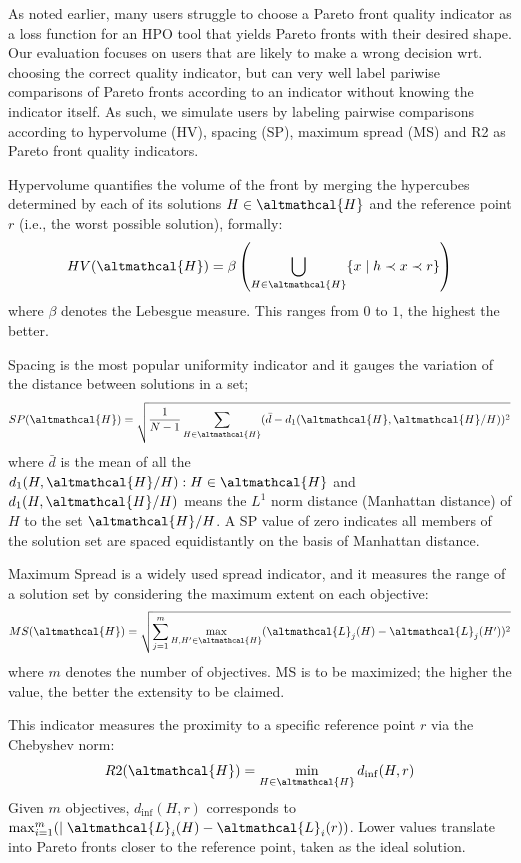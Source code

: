 As noted earlier, many users struggle to choose a Pareto front quality indicator as a loss function for an HPO tool that yields Pareto fronts with their desired shape. Our evaluation focuses on users that are likely to make a wrong decision wrt. choosing the correct quality indicator, but can very well label pariwise comparisons of Pareto fronts according to an indicator without knowing the indicator itself.
As such, we simulate users by labeling pairwise comparisons according to hypervolume (HV), spacing (SP), maximum spread (MS) and R2 as Pareto front quality indicators.

\begin{definition}[Hypervolume (HV)]
    Hypervolume quantifies the volume of the front by merging the hypercubes determined by each of its solutions $H \in \altmathcal{H}$ and the reference point $r$ (i.e., the worst possible solution), formally:
     $$HV(\altmathcal{H}) = \beta \left(\bigcup_{H \in \altmathcal{H}} \{ x \mid h \prec x \prec r \} \right)$$
     where $\beta$ denotes the Lebesgue measure. This ranges from $0$ to $1$, the highest the better.
\end{definition}

\begin{definition}[Spacing (SP)]
    Spacing is the most popular uniformity indicator and it gauges the variation of the distance between solutions in a set;
    $$SP(\altmathcal{H}) = \sqrt{\frac{1}{N-1} \sum_{H \in \altmathcal{H}} ( \bar{d} - d_1 ( \altmathcal{H}, \altmathcal{H}/H ) )^2}$$
    where $\bar{d}$ is the mean of all the $d_1 ( H, \altmathcal{H}/H ) : H \in \altmathcal{H}$ and $d_1 ( H, \altmathcal{H}/H )$ means the $L^1$ norm distance (Manhattan distance) of $H$ to the set $\altmathcal{H}/H$. A SP value of zero indicates all members of the solution set are spaced equidistantly on the basis of Manhattan distance.
\end{definition}

\begin{definition}
    Maximum Spread is a widely used spread indicator, and it measures the range of a solution set by considering the maximum extent on each objective:
    $$MS(\altmathcal{H}) = \sqrt{ \sum_{j = 1}^{m} \max_{H, H' \in \altmathcal{H}} (\altmathcal{L}_{j}(H) - \altmathcal{L}_{j}(H'))^2}$$
    where $m$ denotes the number of objectives. MS is to be maximized; the higher the value, the better the extensity to be claimed.
\end{definition}

\begin{definition}[R2]
    This indicator measures the proximity to a specific reference point $r$ via the Chebyshev norm:
     $$R2(\altmathcal{H}) = \min_{H \in \altmathcal{H}} d_{\inf}(H, r)$$
     Given $m$ objectives, $d_{\inf}(H, r)$ corresponds to $\max_{i=1}^{m}(\mid \altmathcal{L}_i(H) - \altmathcal{L}_i(r))$. Lower values translate into Pareto fronts closer to the reference point, taken as the ideal solution.
\end{definition}

